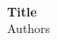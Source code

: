\documentclass[a4paper,11pt,finnish]{article}
\begin{document}
{\setlength{\parindent}{0cm} \Large \textbf{\titletext{}}}\vspace{1mm}\\
{\setlength{\parindent}{0cm} \textbf{Title}}\\
{\setlength{\parindent}{0cm} Authors}\\

\content{}
\end{document}
